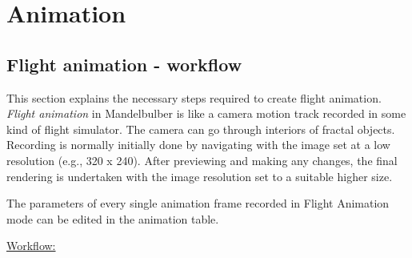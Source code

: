 \section{Animation}\label{animation}

\subsection{Flight animation - workflow}\label{flight-animation}

This section explains the necessary steps required to create flight animation. \emph{Flight animation} in Mandelbulber is like a camera motion track recorded in some kind of flight simulator. The camera can go through interiors of fractal objects.
Recording is normally initially done by navigating with the image set at a low resolution (e.g., 320 x 240). After previewing and making any changes, the final rendering is undertaken with the image resolution set to a suitable higher size.

The parameters of every single animation frame recorded in Flight Animation mode can be edited in the animation table.

\underline{Workflow:}

